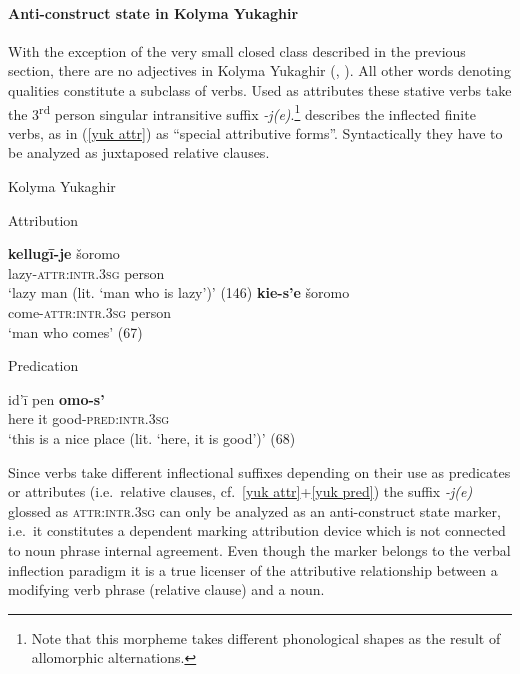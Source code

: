 \paragraph{Anti-construct state in Kolyma Yukaghir}
With the exception of the very small closed class described in the previous section, there are no adjectives in Kolyma Yukaghir (\citealt[79–112]{krejnovic1982}, \citealt[66–69, 145–147]{maslova2003b}). All other words denoting qualities constitute a subclass of verbs. Used as attributes these stative verbs take the 3\textsuperscript{rd} person singular intransitive suffix \mbox{\textit{-j(e)}}.\footnote{Note that this morpheme takes different phonological shapes as the result of allomorphic alternations.} \citet[66, elsewhere]{maslova2003b} describes the inflected finite verbs, as in (\ref{yuk attr}) as “special attributive forms”. Syntactically they have to be analyzed as juxtaposed relative clauses.
\begin{exe}
\ex 	
\rm{Kolyma Yukaghir \citep{maslova2003b}}
\begin{xlist}
\ex 
\label{yuk attr}
\rm{Attribution}
\begin{xlist}
\ex
\gll 	\textbf{kellugī-je} šoromo\\
	lazy-\textsc{attr:intr.3sg} person\\
\glt	‘lazy man (lit. ‘man who is lazy’)’ (146)
\ex
\gll	\textbf{kie-s'e} šoromo\\
	come-\textsc{attr:intr.3sg} person\\
\glt	‘man who comes’ (67)
\end{xlist}

\ex 
\label{yuk pred} 
\rm{Predication}
\begin{xlist}
\ex
\gll 	id'ī pen \textbf{omo-s'}\\
	here it good-\textsc{pred:intr.3sg}\\
\glt	‘this is a nice place (lit. ‘here, it is good’)’ (68)
\end{xlist}
\end{xlist}
\end{exe}
Since verbs take different inflectional suffixes depending on their use as predicates or attributes (i.e.~relative clauses, cf.~\ref{yuk attr}+\ref{yuk pred}) the suffix \textit{-j(e)} glossed as \textsc{attr:intr.3sg} can only be analyzed as an anti-construct state marker, i.e.~it constitutes a dependent marking attribution device which is not connected to noun phrase internal agreement. Even though the marker belongs to the verbal inflection paradigm it is a true licenser of the attributive relationship between a modifying verb phrase (relative clause) and a noun.

